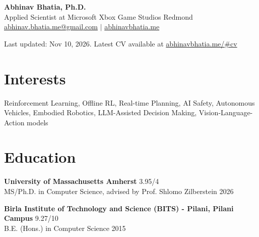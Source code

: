 \documentclass[letterpaper,11pt]{article}
\begin{document}
{\LARGE \textbf{Abhinav Bhatia, Ph.D.}}\\
Applied Scientist at Microsoft Xbox Game Studios Redmond \\
\href{mailto:abhinav.bhatia.me@gmail.com}{abhinav.bhatia.me@gmail.com} $|$ \href{https://abhinavbhatia.me}{abhinavbhatia.me}

{\small Last updated: Nov 10, 2026. Latest CV available at \href{https://abhinavbhatia.me/#cv}{abhinavbhatia.me/\#cv}}

\section*{Interests}
Reinforcement Learning, Offline RL, Real-time Planning, AI Safety, Autonomous Vehicles, Embodied Robotics, LLM-Assisted Decision Making, Vision-Language-Action models

\section*{Education}
\textbf{University of Massachusetts Amherst} \hfill 3.95/4\\
MS/Ph.D. in Computer Science, advised by Prof. Shlomo Zilberstein \hfill 2026

\textbf{Birla Institute of Technology and Science (BITS) - Pilani, Pilani Campus} \hfill 9.27/10\\
B.E. (Hons.) in Computer Science \hfill 2015
\end{document}
